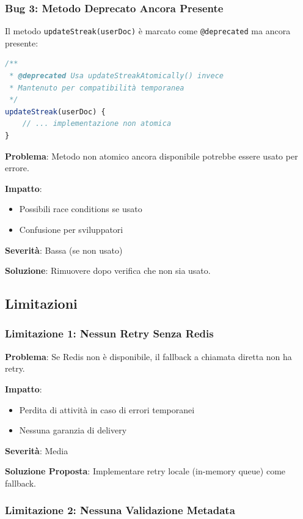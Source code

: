 \documentclass[11pt,a4paper]{article}
\begin{document}
\subsubsection{Bug 3: Metodo Deprecato Ancora Presente}

Il metodo \texttt{updateStreak(userDoc)} è marcato come \texttt{@deprecated} ma ancora presente:

\begin{lstlisting}[language=JavaScript]
/**
 * @deprecated Usa updateStreakAtomically() invece
 * Mantenuto per compatibilità temporanea
 */
updateStreak(userDoc) {
    // ... implementazione non atomica
}
\end{lstlisting}

\textbf{Problema}: Metodo non atomico ancora disponibile potrebbe essere usato per errore.

\textbf{Impatto}: 
\begin{itemize}
    \item Possibili race conditions se usato
    \item Confusione per sviluppatori
\end{itemize}

\textbf{Severità}: Bassa (se non usato)

\textbf{Soluzione}: Rimuovere dopo verifica che non sia usato.

\subsection{Limitazioni}

\subsubsection{Limitazione 1: Nessun Retry Senza Redis}

\textbf{Problema}: Se Redis non è disponibile, il fallback a chiamata diretta non ha retry.

\textbf{Impatto}: 
\begin{itemize}
    \item Perdita di attività in caso di errori temporanei
    \item Nessuna garanzia di delivery
\end{itemize}

\textbf{Severità}: Media

\textbf{Soluzione Proposta}: Implementare retry locale (in-memory queue) come fallback.

\subsubsection{Limitazione 2: Nessuna Validazione Metadata}
\end{document}
